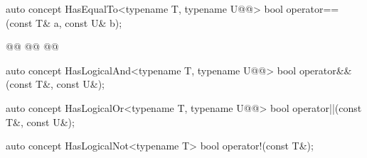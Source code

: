 \documentclass[american,twoside]{book}
\begin{document}
\begin{itemdescr}
\pnum
{}
\end{itemdescr}

\begin{itemdecl}
auto concept HasEqualTo<typename T, typename U@@> {
  bool operator==(const T& a, const U& b);
}
\end{itemdecl}

\begin{itemdescr}
\pnum
{}
\end{itemdescr}

\begin{itemdecl}
@@
  @@
@\addedCC{\}}@
\end{itemdecl}

\begin{itemdescr}
\pnum
{}
\end{itemdescr}

\begin{itemdecl}
auto concept HasLogicalAnd<typename T, typename U@@> {
  bool operator&&(const T&, const U&);
}
\end{itemdecl}

\begin{itemdescr}
\pnum
{}
\end{itemdescr}

\begin{itemdecl}
auto concept HasLogicalOr<typename T, typename U@@> {
  bool operator||(const T&, const U&);
}
\end{itemdecl}

\begin{itemdescr}
\pnum
{}
\end{itemdescr}

\begin{itemdecl}
auto concept HasLogicalNot<typename T> {
  bool operator!(const T&);
}
\end{itemdecl}

\begin{itemdescr}
\pnum
{}
\end{itemdescr}
\end{document}
